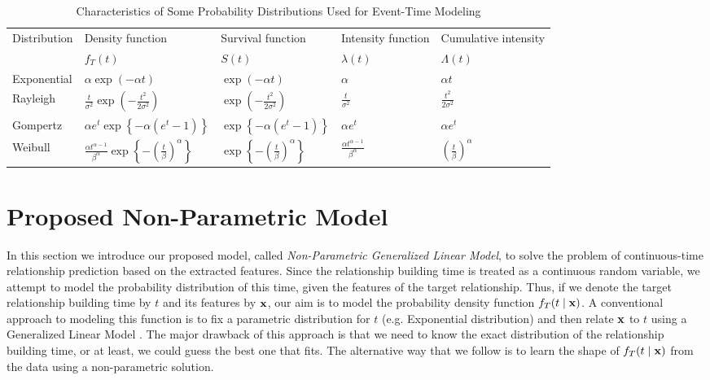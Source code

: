 \begin{table*}
	\centering
	\caption{Characteristics of Some Probability Distributions Used for Event-Time Modeling}
	\label{table:dists}
	\footnotesize
	\begin{tabu} to \textwidth {X X[c] X[c] X[c] X[c]}
		\toprule
		Distribution & Density function & Survival function & Intensity function & Cumulative intensity\\
		& $f_T(t)$ & $S(t)$ & $\lambda(t)$ & $\Lambda(t)$\\[1pt]
		\midrule %
		Exponential & $\alpha\exp(-\alpha t)$ & $\exp(-\alpha t)$ & $\alpha$ & $\alpha t$\\[4pt]
		Rayleigh & $\frac{t}{\sigma^2}\exp(-\frac{t^2}{2\sigma^2})$ & $\exp(-\frac{t^2}{2\sigma^2})$ & $\frac{t}{\sigma^2}$ & $\frac{t^2}{2\sigma^2}$\\[4pt]
		Gompertz & $\alpha e^t\exp\left\lbrace -\alpha(e^t-1) \right\rbrace$ & $\exp\left\lbrace -\alpha(e^t-1) \right\rbrace$ & $\alpha e^t$ & $\alpha e^t$\\[4pt]
		Weibull & $\frac{\alpha t^{\alpha-1}}{\beta^\alpha}\exp\left\lbrace-(\frac{t}{\beta})^\alpha\right\rbrace$ & $\exp\left\lbrace-(\frac{t}{\beta})^\alpha\right\rbrace$ & $\frac{\alpha t^{\alpha-1}}{\beta^\alpha}$ & $(\frac{t}{\beta})^\alpha$\\[2pt]
		\bottomrule %
	\end{tabu}
\end{table*}

\section{Proposed Non-Parametric Model}\label{sec:method}
In this section we introduce our proposed model, called \emph{Non-Parametric Generalized Linear Model}, to solve the problem of continuous-time relationship prediction based on the extracted features. 
Since the relationship building time is treated as a continuous random variable, we attempt to model the probability distribution of this time, given the features of the target relationship. Thus, if we denote the target relationship building time by $t$ and its features by $\mathbf{x}$, our aim is to model the probability density function $f_T(t\mid \mathbf{x})$. A conventional approach to modeling this function is to fix a parametric distribution for $t$ (e.g. Exponential distribution) and then relate $\mathbf{x}$ to $t$ using a Generalized Linear Model \cite{sun2012will}. The major drawback of this approach is that we need to know the exact distribution of the relationship building time, or at least, we could guess the best one that fits. The alternative way that we follow is to learn the shape of $f_T(t\mid \mathbf{x})$ from the data using a non-parametric solution.

